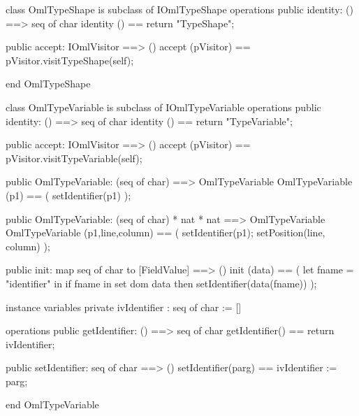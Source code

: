 \begin{vdm_al}
class OmlTypeShape is subclass of IOmlTypeShape
operations
  public identity: () ==> seq of char
  identity () == return "TypeShape";

  public accept: IOmlVisitor ==> ()
  accept (pVisitor) == pVisitor.visitTypeShape(self);

end OmlTypeShape
\end{vdm_al}
\begin{vdm_al}
class OmlTypeVariable is subclass of IOmlTypeVariable
operations
  public identity: () ==> seq of char
  identity () == return "TypeVariable";

  public accept: IOmlVisitor ==> ()
  accept (pVisitor) == pVisitor.visitTypeVariable(self);

  public OmlTypeVariable:
    (seq of char) ==> OmlTypeVariable
  OmlTypeVariable (p1) == 
    ( setIdentifier(p1) );

  public OmlTypeVariable:
    (seq of char) *
    nat *
    nat ==> OmlTypeVariable
  OmlTypeVariable (p1,line,column) == 
    ( setIdentifier(p1);
      setPosition(line, column) );

  public init: map seq of char to [FieldValue] ==> ()
  init (data) ==
    ( let fname = "identifier" in
        if fname in set dom data
        then setIdentifier(data(fname)) );

instance variables
  private ivIdentifier : seq of char := []

operations
  public getIdentifier: () ==> seq of char
  getIdentifier() == return ivIdentifier;

  public setIdentifier: seq of char ==> ()
  setIdentifier(parg) == ivIdentifier := parg;

end OmlTypeVariable
\end{vdm_al}

